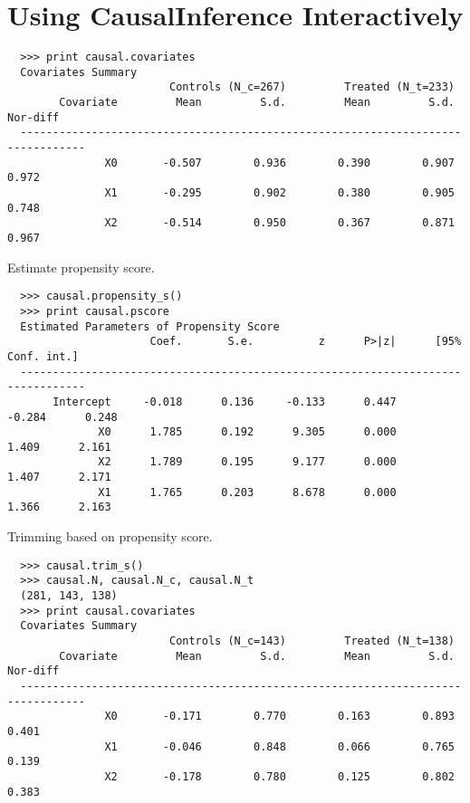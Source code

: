 \documentclass[12pt]{article}
\theoremstyle{definition}
\theoremstyle{definition}
\theoremstyle{definition}
\theoremstyle{remark}
\begin{document}
\section*{Using CausalInference Interactively}

\begin{verbatim}
  >>> print causal.covariates
  Covariates Summary
                         Controls (N_c=267)         Treated (N_t=233)
        Covariate         Mean         S.d.         Mean         S.d.     Nor-diff
  --------------------------------------------------------------------------------
               X0       -0.507        0.936        0.390        0.907        0.972
               X1       -0.295        0.902        0.380        0.905        0.748
               X2       -0.514        0.950        0.367        0.871        0.967
\end{verbatim}

Estimate propensity score.

\begin{verbatim}
  >>> causal.propensity_s()
  >>> print causal.pscore
  Estimated Parameters of Propensity Score
                      Coef.       S.e.          z      P>|z|      [95% Conf. int.]
  --------------------------------------------------------------------------------
       Intercept     -0.018      0.136     -0.133      0.447     -0.284      0.248
              X0      1.785      0.192      9.305      0.000      1.409      2.161
              X2      1.789      0.195      9.177      0.000      1.407      2.171
              X1      1.765      0.203      8.678      0.000      1.366      2.163
\end{verbatim}

Trimming based on propensity score.

\begin{verbatim}
  >>> causal.trim_s()
  >>> causal.N, causal.N_c, causal.N_t
  (281, 143, 138)
  >>> print causal.covariates
  Covariates Summary
                         Controls (N_c=143)         Treated (N_t=138)             
        Covariate         Mean         S.d.         Mean         S.d.     Nor-diff
  --------------------------------------------------------------------------------
               X0       -0.171        0.770        0.163        0.893        0.401
               X1       -0.046        0.848        0.066        0.765        0.139
               X2       -0.178        0.780        0.125        0.802        0.383
\end{verbatim}
\end{document}
